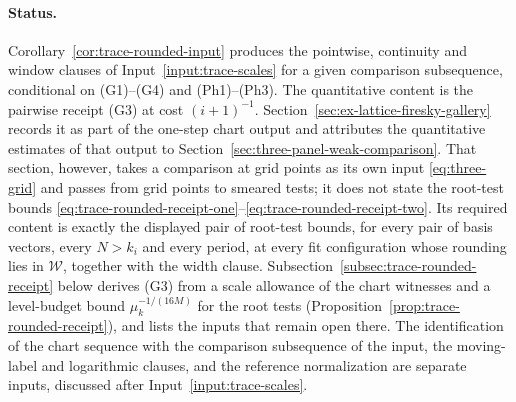 \paragraph{Status.}
Corollary~\ref{cor:trace-rounded-input} produces the pointwise,
continuity and window clauses of Input~\ref{input:trace-scales} for a
given comparison subsequence, conditional on (G1)--(G4) and
(Ph1)--(Ph3). The quantitative content is the pairwise receipt (G3) at
cost $(i+1)^{-1}$. Section~\ref{sec:ex-lattice-firesky-gallery} records
it as part of the one-step chart output and attributes the quantitative
estimates of that output to Section~\ref{sec:three-panel-weak-comparison}.
That section, however, takes a comparison at grid points as its own input
\eqref{eq:three-grid} and passes from grid points to smeared tests; it
does not state the root-test bounds
\eqref{eq:trace-rounded-receipt-one}--\eqref{eq:trace-rounded-receipt-two}.
Its required content is exactly the displayed pair of root-test bounds,
for every pair of basis vectors, every $N>k_i$ and every period, at every
fit configuration whose rounding lies in $\mathcal W$, together with the
width clause. Subsection~\ref{subsec:trace-rounded-receipt} below derives
(G3) from a scale allowance of the chart witnesses and a level-budget
bound $\mu_k^{-1/(16M)}$ for the root tests
(Proposition~\ref{prop:trace-rounded-receipt}), and lists the inputs
that remain open there.
The identification of the chart sequence with the comparison
subsequence of the input, the moving-label and logarithmic clauses, and
the reference normalization are separate inputs, discussed after
Input~\ref{input:trace-scales}.


